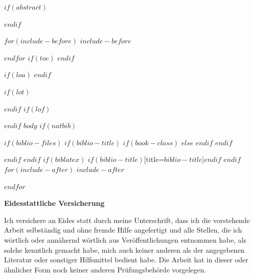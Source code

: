 \documentclass[$if(fontsize)$$fontsize$,$endif$$if(lang)$$lang$,$endif$$if(papersize)$$papersize$,$endif$$for(classoption)$$classoption$$sep$,$endfor$]{$documentclass$}
\begin{document}
\restoregeometry

$if(abstract)$
\begin{abstract}
$abstract$
\end{abstract}
\newpage
$endif$

$for(include-before)$
$include-before$

$endfor$
$if(toc)$
{
\hypersetup{linkcolor=black}
\setcounter{tocdepth}{$toc-depth$}
\tableofcontents
}
$endif$


$if(loa)$
\newpage
\printnoidxglossary[type=acronym, style=superheader,title=Acronyms]
$endif$

$if(lot)$
\newpage
\listoftables
$endif$
$if(lof)$
\newpage
\listoffigures
$endif$
\newpage
{} 
$body$
$if(natbib)$

$if(biblio-files)$
$if(biblio-title)$
$if(book-class)$
\renewcommand\bibname{$biblio-title$}
$else$
\renewcommand\refname{$biblio-title$}
$endif$
$endif$


$endif$
$endif$
$if(biblatex)$
\renewcommand*{\mkbibnamefamily}[1]{\textbf{#1}}
\renewcommand*{\mkbibnamegiven}[1]{\textbf{#1}}
\renewcommand*{\mkbibnameprefix}[1]{\textbf{#1}}
\renewcommand*{\mkbibnamesuffix}[1]{\textbf{#1}}
\printbibliography$if(biblio-title)$[title=$biblio-title$]$endif$
$endif$
$for(include-after)$
$include-after$

$endfor$

\newpage
\textbf{Eidesstattliche Versicherung}

\bigskip

Ich versichere an Eides statt durch meine Unterschrift, dass ich die vorstehende Arbeit selbständig und ohne fremde Hilfe angefertigt und alle Stellen, die ich wörtlich oder annähernd wörtlich aus Veröffentlichungen entnommen habe, als solche kenntlich gemacht habe, mich auch keiner anderen als der angegebenen Literatur oder sonstiger Hilfsmittel bedient habe. Die Arbeit hat in dieser oder ähnlicher Form noch keiner anderen Prüfungsbehörde vorgelegen.

\vspace{1cm}
\rule{0pt}{2\baselineskip} %
\par\noindent{} \hfill\makebox[2.25in]{\hrulefill}%
\par\noindent\makebox[2.25in][l]{} \hfill{}%
\end{document}
